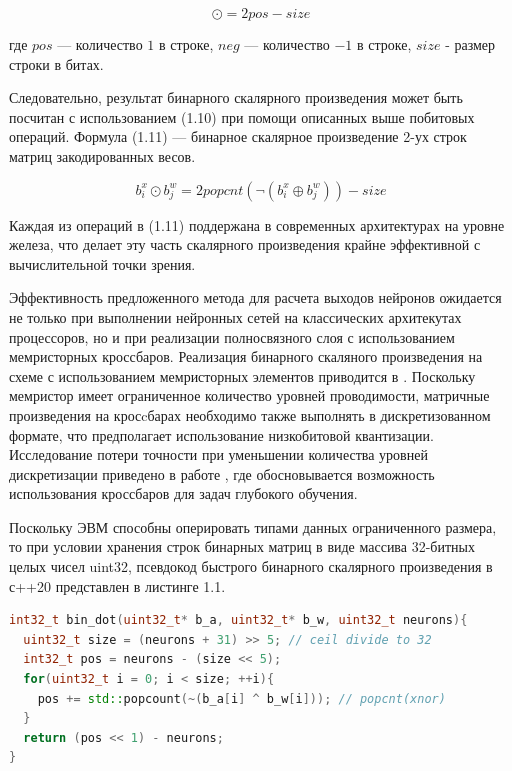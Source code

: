 \begin{equation}
 \odot = 2 pos - size
\end{equation}

где $pos$ — количество $1$ в строке, $neg$ — количество $-1$ в строке, $size$ -  размер строки в битах. 

Следовательно, результат бинарного скалярного произведения может быть посчитан с использованием (1.10) при помощи описанных выше побитовых операций. Формула (1.11) — бинарное скалярное произведение 2-ух строк матриц закодированных весов.

\begin{equation}
b^x_{i} \odot b^w_{j} = 2 popcnt(\lnot(b^x_i \oplus b^w_j)) - size
\end{equation}

Каждая из операций в (1.11) поддержана в современных архитектурах на уровне железа, что делает эту часть скалярного произведения крайне эффективной с вычислительной точки зрения.

Эффективность предложенного метода для расчета выходов нейронов ожидается не только при выполнении нейронных сетей на классических архитекутах процессоров, но и при реализации полносвязного слоя с использованием мемристорных кроссбаров. Реализация бинарного скаляного произведения на схеме с использованием мемристорных элементов приводится в \cite{memristor}. Поскольку мемристор имеет ограниченное количество уровней проводимости, матричные произведения на кросcбарах необходимо также выполнять в дискретизованном формате, что предполагает использование низкобитовой квантизации. Исследование потери точности при уменьшении количества уровней дискретизации приведено в работе \cite{discret}, где обосновывается возможность использования кроссбаров для задач глубокого обучения.

Поскольку ЭВМ способны оперировать типами данных ограниченного размера, то при условии хранения строк бинарных матриц в виде массива 32-битных целых чисел uint32, псевдокод быстрого бинарного скалярного произведения в с++20 представлен в листинге 1.1.


\begin{lstlisting}[language=C++, caption={Пример модели с LQFullyConnected}]
int32_t bin_dot(uint32_t* b_a, uint32_t* b_w, uint32_t neurons){
  uint32_t size = (neurons + 31) >> 5; // ceil divide to 32
  int32_t pos = neurons - (size << 5);
  for(uint32_t i = 0; i < size; ++i){
    pos += std::popcount(~(b_a[i] ^ b_w[i])); // popcnt(xnor)
  }
  return (pos << 1) - neurons;
}
\end{lstlisting}

